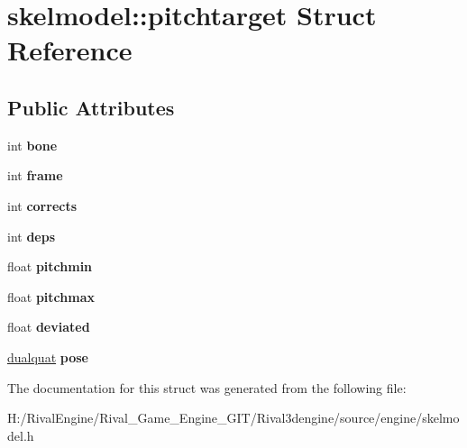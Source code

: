 \hypertarget{structskelmodel_1_1pitchtarget}{}\section{skelmodel\+:\+:pitchtarget Struct Reference}
\label{structskelmodel_1_1pitchtarget}
\subsection*{Public Attributes}
\begin{DoxyCompactItemize}
\item 
\mbox{\label{structskelmodel_1_1pitchtarget_ac72bf3c8a0ef714a661b5aecc3067f56}} 
int {\bfseries bone}
\item 
\mbox{\label{structskelmodel_1_1pitchtarget_a5a8f6c005a7e16d8f394ef7d027dcf48}} 
int {\bfseries frame}
\item 
\mbox{\label{structskelmodel_1_1pitchtarget_aff57fb89a5508758890e17dad952dd1c}} 
int {\bfseries corrects}
\item 
\mbox{\label{structskelmodel_1_1pitchtarget_a8ec7e0a773b6888600486b14f91e773b}} 
int {\bfseries deps}
\item 
\mbox{\label{structskelmodel_1_1pitchtarget_acf28eb54e6bff43e7d0253bfe192ac62}} 
float {\bfseries pitchmin}
\item 
\mbox{\label{structskelmodel_1_1pitchtarget_ae952cdad2c8322b28493547aaae8aaf3}} 
float {\bfseries pitchmax}
\item 
\mbox{\label{structskelmodel_1_1pitchtarget_a095747d37df4a33d5b8b36e82535a48d}} 
float {\bfseries deviated}
\item 
\mbox{\label{structskelmodel_1_1pitchtarget_ab924ca619cd1919283e33e144d0f3ea4}} 
\hyperlink{structdualquat}{dualquat} {\bfseries pose}
\end{DoxyCompactItemize}


The documentation for this struct was generated from the following file\+:\begin{DoxyCompactItemize}
\item 
H\+:/\+Rival\+Engine/\+Rival\+\_\+\+Game\+\_\+\+Engine\+\_\+\+G\+I\+T/\+Rival3dengine/source/engine/skelmodel.\+h\end{DoxyCompactItemize}
